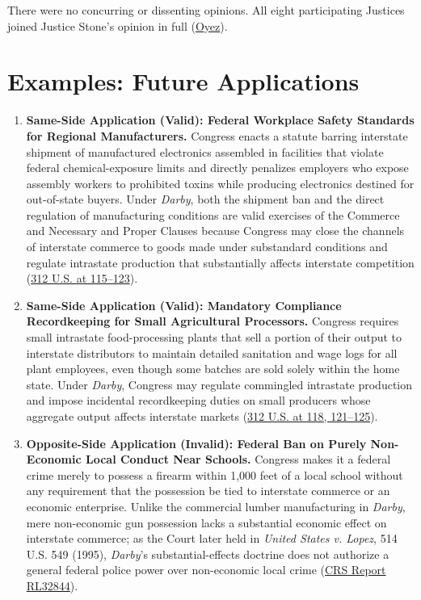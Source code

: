 \documentclass[12pt]{article}
\begin{document}
There were no concurring or dissenting opinions. All eight participating Justices joined Justice Stone's opinion in full (\href{https://www.oyez.org/cases/1940-1955/312us100}{Oyez}).

\section{Examples: Future Applications}

\begin{enumerate}
\item \textbf{Same-Side Application (Valid): Federal Workplace Safety Standards for Regional Manufacturers.} Congress enacts a statute barring interstate shipment of manufactured electronics assembled in facilities that violate federal chemical-exposure limits and directly penalizes employers who expose assembly workers to prohibited toxins while producing electronics destined for out-of-state buyers. Under \textit{Darby}, both the shipment ban and the direct regulation of manufacturing conditions are valid exercises of the Commerce and Necessary and Proper Clauses because Congress may close the channels of interstate commerce to goods made under substandard conditions and regulate intrastate production that substantially affects interstate competition (\href{https://supreme.justia.com/cases/federal/us/312/100/}{312 U.S. at 115--123}).

\item \textbf{Same-Side Application (Valid): Mandatory Compliance Recordkeeping for Small Agricultural Processors.} Congress requires small intrastate food-processing plants that sell a portion of their output to interstate distributors to maintain detailed sanitation and wage logs for all plant employees, even though some batches are sold solely within the home state. Under \textit{Darby}, Congress may regulate commingled intrastate production and impose incidental recordkeeping duties on small producers whose aggregate output affects interstate markets (\href{https://supreme.justia.com/cases/federal/us/312/100/}{312 U.S. at 118, 121--125}).

\item \textbf{Opposite-Side Application (Invalid): Federal Ban on Purely Non-Economic Local Conduct Near Schools.} Congress makes it a federal crime merely to possess a firearm within 1,000 feet of a local school without any requirement that the possession be tied to interstate commerce or an economic enterprise. Unlike the commercial lumber manufacturing in \textit{Darby}, mere non-economic gun possession lacks a substantial economic effect on interstate commerce; as the Court later held in \textit{United States v. Lopez}, 514 U.S. 549 (1995), \textit{Darby}'s substantial-effects doctrine does not authorize a general federal police power over non-economic local crime (\href{https://www.everycrsreport.com/reports/RL32844.html}{CRS Report RL32844}).


\end{enumerate}
\end{document}

